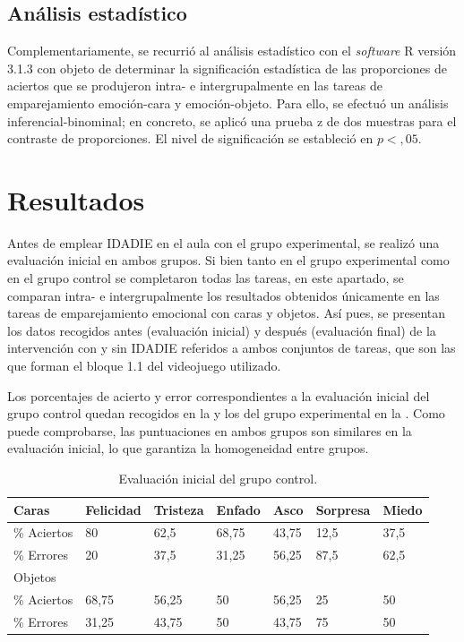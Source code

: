 \documentclass[spanish]{textolivre}
\begin{document}
\subsection{Análisis estadístico}\label{sec-modelo}
Complementariamente, se recurrió al análisis estadístico con el \textit{software} R versión 3.1.3 %
\cite{rsoftware} con objeto de determinar la significación estadística de las proporciones de aciertos que se produjeron intra- e intergrupalmente en las tareas de emparejamiento emoción-cara y emoción-objeto. Para ello, se efectuó un análisis inferencial-binominal; en concreto, se aplicó una prueba z de dos muestras para el contraste de proporciones. El nivel de significación se estableció en $p < ,05$.

\section{Resultados}\label{sec-organizacao}
Antes de emplear IDADIE en el aula con el grupo experimental, se realizó una evaluación inicial en ambos grupos. Si bien tanto en el grupo experimental como en el grupo control se completaron todas las tareas, en este apartado, se comparan intra- e intergrupalmente los resultados obtenidos únicamente en las tareas de emparejamiento emocional con caras y objetos. Así pues, se presentan los datos recogidos antes (evaluación inicial) y después (evaluación final) de la intervención con y sin IDADIE referidos a ambos conjuntos de tareas, que son las que forman el bloque 1.1 del videojuego utilizado.

Los porcentajes de acierto y error correspondientes a la evaluación inicial del grupo control quedan recogidos en la  y los del grupo experimental en la . Como puede comprobarse, las puntuaciones en ambos grupos son similares en la evaluación inicial, lo que garantiza la homogeneidad entre grupos.

\begin{table}[h!]
\centering
\begin{threeparttable}
\caption{Evaluación inicial del grupo control.}
\label{tab01}
\begin{tabular}{l l l l l l l}
\toprule
 Caras & Felicidad & Tristeza & Enfado & Asco & Sorpresa & Miedo \\
 \midrule
\% Aciertos & 80 & 62,5 & 68,75 & 43,75 & 12,5 & 37,5 \\
\% Errores & 20 & 37,5 & 31,25 & 56,25 & 87,5 & 62,5 \\
Objetos & & & & & & \\
\% Aciertos & 68,75 & 56,25 & 50 & 56,25 & 25 & 50 \\
\% Errores & 31,25 & 43,75 & 50 & 43,75 & 75 & 50 \\
\bottomrule
\end{tabular}
\end{threeparttable}
\end{table}
\end{document}
